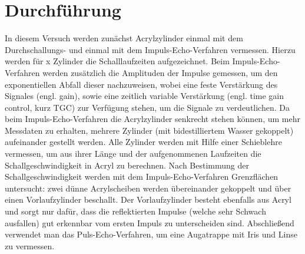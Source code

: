\section{Durchführung}
\label{sec:Durchführung}
In diesem Versuch werden zunächst Acrylzylinder einmal mit dem Durchschallungs- und einmal mit dem Impuls-Echo-Verfahren vermessen. Hierzu werden für x Zylinder die Schalllaufzeiten aufgezeichnet. Beim Impuls-Echo-Verfahren werden zusätzlich die Amplituden der Impulse gemessen, um den exponentiellen Abfall dieser nachzuweisen, wobei eine feste Verstärkung des Signales (engl. gain), sowie eine zeitlich variable Verstärkung (engl. time gain control, kurz TGC) zur Verfügung stehen, um die Signale zu verdeutlichen. Da beim Impuls-Echo-Verfahren die Acrylzylinder senkrecht stehen können, um mehr Messdaten zu erhalten, mehrere Zylinder (mit bidestilliertem Wasser gekoppelt) aufeinander gestellt werden. Alle Zylinder werden mit Hilfe einer Schieblehre vermessen, um aus ihrer Länge und der aufgenommenen Laufzeiten die Schallgeschwindigkeit in Acryl zu berechnen.
Nach Bestimmung der Schallgeschwindigkeit werden mit dem Impuls-Echo-Verfahren Grenzflächen untersucht: zwei dünne Acrylscheiben werden übereinander gekoppelt und über einen Vorlaufzylinder beschallt. Der Vorlaufzylinder besteht ebenfalls aus Acryl und sorgt nur dafür, dass die reflektierten Impulse (welche sehr Schwach ausfallen) gut erkennbar vom ersten Impuls zu unterscheiden sind.
Abschließend verwendet man das Puls-Echo-Verfahren, um eine Augatrappe mit Iris und Linse zu vermessen.
